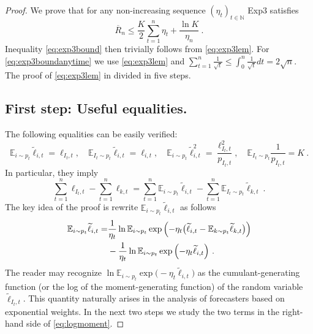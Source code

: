 \documentclass[11pt]{hackednow}
\newcommand{\E}{\mathbb{E}}
\newcommand{\N}{\mathbb{N}}
\newcommand{\oR}{\overline{R}}
\renewcommand{\tilde}{\widetilde}
\begin{document}
\begin{proof}
We prove that for any non-increasing sequence $(\eta_t)_{t \in \N}$ Exp3 satisfies
\begin{equation} \label{eq:exp3lem}
\oR_n \leq \frac{K}{2} \sum_{t=1}^n \eta_t + \frac{\ln K}{\eta_n}~.
\end{equation}
Inequality \eqref{eq:exp3bound} then trivially follows from \eqref{eq:exp3lem}. For \eqref{eq:exp3boundanytime} we use \eqref{eq:exp3lem} and
$\sum_{t=1}^n \frac{1}{\sqrt{t}} \leq \int_{0}^n \frac{1}{\sqrt{t}} dt = 2 \sqrt{n}$. The proof of \eqref{eq:exp3lem} in divided in five steps.

\subsection*{First step: Useful equalities.}
The following equalities can be easily verified:
\begin{equation} \label{eq:equalities}
\E_{i \sim p_t} \tilde{\ell}_{i,t} = \ell_{I_t,t}, \quad \E_{I_t \sim p_t} \tilde{\ell}_{i,t} = \ell_{i,t}, \quad
\E_{i \sim p_t} {\tilde{\ell}}^2_{i,t} = \frac{\ell_{I_t,t}^2}{p_{I_t,t}}, \quad \E_{I_t \sim p_t} \frac{1}{p_{I_t,t}} = K~.
\end{equation}
In particular, they imply
\begin{equation} \label{eq:expregret}
\sum_{t=1}^n \ell_{I_t,t} - \sum_{t=1}^n \ell_{k,t}  = \sum_{t=1}^n \E_{i \sim p_t} \tilde{\ell}_{i,t} - \sum_{t=1}^n \E_{I_t \sim p_t} \tilde{\ell}_{k,t}~.
\end{equation}
The key idea of the proof is rewrite $\E_{i \sim p_t} \tilde{\ell}_{i,t}$ as follows 
\begin{align} 
 \E_{i \sim p_t} \tilde{\ell}_{i,t} = & \frac{1}{\eta_t} \ln \E_{i \sim p_t} \exp{\left(- \eta_t \bigl(\tilde{\ell}_{i,t}  - \E_{k \sim p_t} \tilde{\ell}_{k,t}\bigr) \right)}  \notag \\
&- \frac{1}{\eta_t} \ln \E_{i \sim p_t} \exp{\left(- \eta_t \tilde{\ell}_{i,t} \right)}~. \label{eq:logmoment}
\end{align}
The reader may recognize $\ln \E_{i \sim p_t} \exp{\bigl(- \eta_t \tilde{\ell}_{i,t} \bigr)}$ as the cumulant-generating function (or the log of the moment-generating function) of the random variable $\tilde{\ell}_{I_t,t}$. This quantity naturally arises in the analysis of forecasters based on exponential weights. In the next two steps we study the two terms in the right-hand side of \eqref{eq:logmoment}.


\end{proof}
\end{document}
